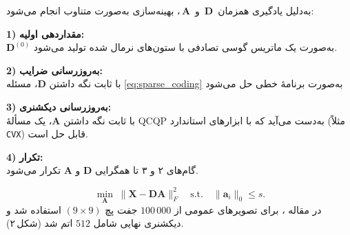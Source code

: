 به‌دلیل یادگیری همزمان $\,\mathbf{D}\,$ و $\,\mathbf{A}\,$،
بهینه‌سازی به‌صورت متناوب انجام می‌شود:
\bigskip   %

\noindent\textbf{1)} \textbf{مقداردهی اولیه:}\\
\noindent
$\mathbf{D}^{(0)}$ به‌صورت یک ماتریس گوسی تصادفی با ستون‌های نرمال شده تولید می‌شود.
\vspace{0.6\baselineskip}

\noindent\textbf{2)} \textbf{به‌روزرسانی ضرایب:}\\
\noindent
با ثابت نگه داشتن $\mathbf{D}$، مسئله \eqref{eq:sparse_coding}
به‌صورت برنامهٔ خطی  حل می‌شود
\vspace{0.6\baselineskip}

\noindent\textbf{3)} \textbf{به‌روزرسانی دیکشنری:}\\
\noindent
با ثابت نگه داشتن $\mathbf{A}$، یک مسألهٔ QCQP به‌دست می‌آید که با ابزارهای استاندارد
(مثلاً \texttt{CVX}) قابل حل است.
\vspace{0.6\baselineskip}

\noindent\textbf{4)} \textbf{تکرار:}\\
\noindent
گام‌های ۲ و ۳ تا همگرایی $\mathbf{D}$ و $\mathbf{A}$ تکرار می‌شود.

\bigskip

\begin{equation}\label{eq:sparse_coding}
	\min_{\mathbf{A}}\;\|\mathbf{X}-\mathbf{D}\mathbf{A}\|_{F}^{2}
	\quad\text{s.t.}\quad \|\mathbf{a}_{i}\|_{0}\le s .
\end{equation}
در مقاله \cite{yang2010scsr}، برای تصویرهای عمومی از $100\,000$
جفت پچ $(9\times9)$ استفاده شد و دیکشنری نهایی شامل $512$ اتم شد
(شکل ۲).


